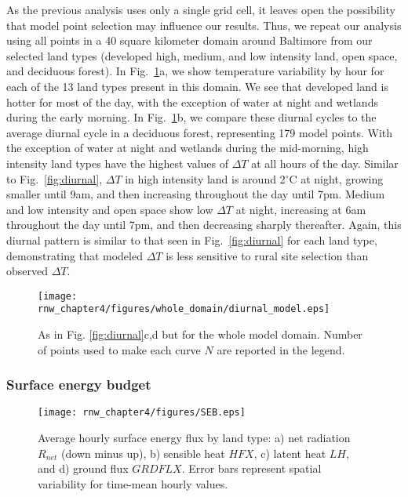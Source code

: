 As the previous analysis uses only a single grid cell, it leaves open the possibility that model point selection may influence our results. Thus, we repeat our analysis using all points in a 40 square kilometer domain around Baltimore from our selected land types (developed high, medium, and low intensity land, open space, and deciduous forest). In Fig.~\ref{fig:diurnal_wd}a, we show temperature variability by hour for each of the 13 land types present in this domain. We see that developed land is hotter for most of the day, with the exception of water at night and wetlands during the early morning. %
In Fig.~\ref{fig:diurnal_wd}b, we compare these diurnal cycles to the average diurnal cycle in a deciduous forest, representing 179 model points. With the exception of water at night and wetlands during the mid-morning, high intensity land types have the highest values of $\Delta T$ at all hours of the day. Similar to Fig.~\ref{fig:diurnal}, $\Delta T$ in high intensity land is around 2$^\circ$C at night, growing smaller until 9am, and then increasing throughout the day until 7pm. Medium and low intensity and open space show low $\Delta T$ at night, increasing at 6am throughout the day until 7pm, and then decreasing sharply thereafter. Again, this diurnal pattern is similar to that seen in Fig.~\ref{fig:diurnal} for each land type, demonstrating that modeled $\Delta T$ is less sensitive to rural site selection than observed $\Delta T$. 

\begin{figure}
\centering
\texttt{[image: rnw\_chapter4/figures/whole\_domain/diurnal\_model.eps]}
\caption{As in Fig. \ref{fig:diurnal}c,d but for the whole model domain. Number of points used to make each curve $N$ are reported in the legend.}%
\label{fig:diurnal_wd}
\end{figure}

 
\subsubsection{Surface energy budget}

\begin{figure}[h]
\centering
\texttt{[image: rnw\_chapter4/figures/SEB.eps]}
\caption{Average hourly surface energy flux by land type: a) net radiation $R_{net}$ (down minus up), b) sensible heat $HFX$, c) latent heat $LH$, and d) ground flux $GRDFLX$. Error bars represent spatial variability for time-mean hourly values.}
\label{fig:seb}
\end{figure}

